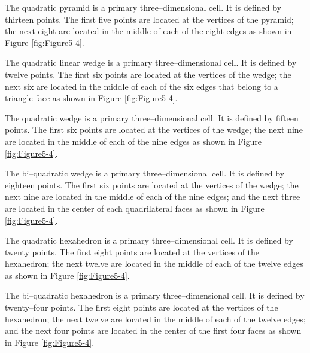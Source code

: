 \begin{description}[leftmargin=0cm,labelindent=0cm]
\item[Quadratic Pyramid.\index{cell!quadratic pyramid}] The quadratic pyramid is a primary three--dimensional cell. It is defined by thirteen points. The first five points are located at the vertices of the pyramid; the next eight are located in the middle of each of the eight edges as shown in Figure \ref{fig:Figure5-4}.

\item[Quadratic Linear Wedge.\index{cell!quadratic linear wedge}] The quadratic linear wedge is a primary three--dimensional cell. It is defined by twelve points. The first six points are located at the vertices of the wedge; the next six are located in the middle of each of the six edges that belong to a triangle face as shown in Figure \ref{fig:Figure5-4}.

\item[Quadratic Wedge.\index{cell!quadratic wedge}] The quadratic wedge is a primary three--dimensional cell. It is defined by fifteen points. The first six points are located at the vertices of the wedge; the next nine are located in the middle of each of the nine edges as shown in Figure \ref{fig:Figure5-4}.

\item[Bi--Quadratic Wedge.\index{bi-quadratic wedge}\index{cell!bi-quadratic wedge}] The bi--quadratic wedge is a primary three--dimensional cell. It is defined by eighteen points. The first six points are located at the vertices of the wedge; the next nine are located in the middle of each of the nine edges; and the next three are located in the center of each quadrilateral faces as shown in Figure \ref{fig:Figure5-4}.

\item[Quadratic Hexahedron.\index{cell!quadratic hexahedron}] The quadratic hexahedron is a primary three--dimensional cell. It is defined by twenty points. The first eight points are located at the vertices of the hexahedron; the next twelve are located in the middle of each of the twelve edges as shown in Figure \ref{fig:Figure5-4}.

\item[Bi--Quadratic Hexahedron.\index{bi-quadratic hexahedron}\index{cell!bi-quadratic hexahedron}] The bi--quadratic hexahedron is a primary three--dimensional cell. It is defined by twenty--four points. The first eight points are located at the vertices of the hexahedron; the next twelve are located in the middle of each of the twelve edges; and the next four points are located in the center of the first four faces as shown in Figure \ref{fig:Figure5-4}.


\end{description}

